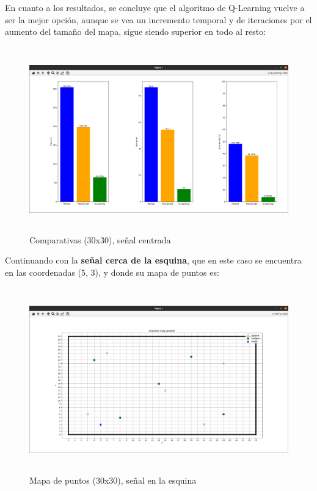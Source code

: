 En cuanto a los resultados, se concluye que el algoritmo de Q-Learning vuelve a ser la mejor opción, aunque se vea un incremento temporal y de iteraciones por el aumento del tamaño del mapa, sigue siendo superior en todo al resto:\\

\begin{figure} [H]
    \begin{center}
    \includegraphics[height=8cm]{imagenes/cap4/22_comp_centro_30.png}
    \end{center}
    \caption[Comparativas (30x30), señal centrada]{Comparativas (30x30), señal centrada}
    \label{fig:comp_center_30}
\end{figure}

Continuando con la \textbf{señal cerca de la esquina}, que en este caso se encuentra en las coordenadas (5, 3), y donde su mapa de puntos es:\\

\begin{figure} [H]
    \begin{center}
    \includegraphics[height=8cm]{imagenes/cap4/23_mapa_p_esq_30.png}
    \end{center}
    \caption[Mapa de puntos (30x30), señal en la esquina]{Mapa de puntos (30x30), señal en la esquina}
    \label{fig:map_p_esq_30}
\end{figure}


